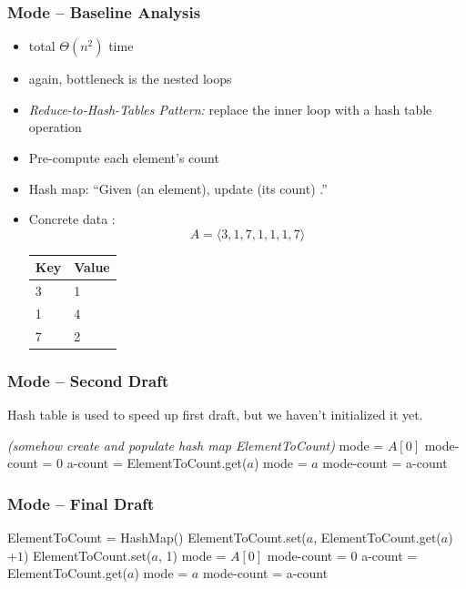 \documentclass[10pt]{beamer}
\begin{document}
\begin{frame} \frametitle{Mode -- Baseline Analysis}
  \begin{itemize}
    \item total $\Theta(n^2)$ time
    \item again, bottleneck is the nested loops
    \item \emph{Reduce-to-Hash-Tables Pattern:} replace the inner loop with a hash table operation
    \item Pre-compute each element's count
    \item Hash map:  ``Given (an element), update (its count) .''
    \item Concrete data :
    \[A = \langle 3, 1, 7, 1, 1, 1, 7 \rangle \]
    \begin{center}
      \begin{tabular}{ll}
        \textbf{Key} & \textbf{Value} \\ \hline
        3 & 1 \\
        1 & 4 \\
        7 & 2 \\
      \end{tabular}
    \end{center}
  \end{itemize}
\end{frame}


\begin{frame} \frametitle{Mode -- Second Draft}
  Hash table is used to speed up first draft, but we haven't initialized it yet.
  \vspace{12pt}

  {\footnotesize
  \begin{algorithmic}[1]
    \State \emph{(somehow create and populate hash map ElementToCount)}
    \State mode = $A[0]$
    \State mode-count = 0
        \State a-count = ElementToCount.get($a$)
          \State mode = $a$
          \State mode-count = a-count
      \EndIf
    \EndFor
    \State {}
    \EndFunction
  \end{algorithmic}
  }
\end{frame}


\begin{frame} \frametitle{Mode -- Final Draft}
  {\footnotesize
  \begin{algorithmic}[1]
    \State ElementToCount = HashMap()
        \State ElementToCount.set($a$, ElementToCount.get($a$) $+ 1$)
      \Else
        \State ElementToCount.set($a$, 1)
      \EndIf
    \EndFor
    \State mode = $A[0]$
    \State mode-count = 0
        \State a-count = ElementToCount.get($a$)
          \State mode = $a$
          \State mode-count = a-count
      \EndIf
    \EndFor
    \State {}
    \EndFunction
  \end{algorithmic}
  }
\end{frame}
\end{document}
